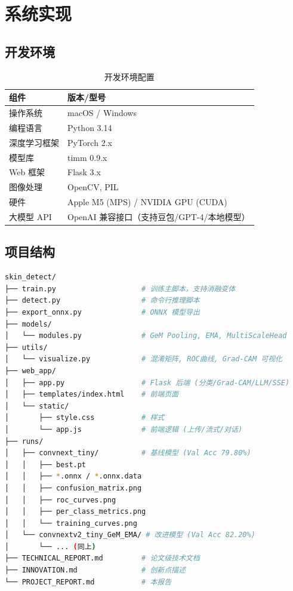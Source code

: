 \documentclass[12pt,a4paper]{report}
\begin{document}
\chapter{系统实现}

\section{开发环境}

\begin{table}[H]
    \centering
    \caption{开发环境配置}
    \label{tab:dev_env}
    \begin{tabular}{l l}
        \toprule
        \textbf{组件} & \textbf{版本/型号} \\
        \midrule
        操作系统 & macOS / Windows \\
        编程语言 & Python 3.14 \\
        深度学习框架 & PyTorch 2.x \\
        模型库 & timm 0.9.x \\
        Web 框架 & Flask 3.x \\
        图像处理 & OpenCV, PIL \\
        硬件 & Apple M5 (MPS) / NVIDIA GPU (CUDA) \\
        大模型 API & OpenAI 兼容接口（支持豆包/GPT-4/本地模型） \\
        \bottomrule
    \end{tabular}
\end{table}

\section{项目结构}

\begin{lstlisting}[language=bash, caption=项目目录结构]
skin_detect/
├── train.py                    # 训练主脚本，支持消融变体
├── detect.py                   # 命令行推理脚本
├── export_onnx.py              # ONNX 模型导出
├── models/
│   └── modules.py              # GeM Pooling, EMA, MultiScaleHead
├── utils/
│   └── visualize.py            # 混淆矩阵, ROC曲线, Grad-CAM 可视化
├── web_app/
│   ├── app.py                  # Flask 后端 (分类/Grad-CAM/LLM/SSE)
│   ├── templates/index.html    # 前端页面
│   └── static/
│       ├── style.css           # 样式
│       └── app.js              # 前端逻辑 (上传/流式/对话)
├── runs/
│   ├── convnext_tiny/          # 基线模型 (Val Acc 79.80%)
│   │   ├── best.pt
│   │   ├── *.onnx / *.onnx.data
│   │   ├── confusion_matrix.png
│   │   ├── roc_curves.png
│   │   ├── per_class_metrics.png
│   │   └── training_curves.png
│   └── convnextv2_tiny_GeM_EMA/ # 改进模型 (Val Acc 82.20%)
│       └── ... (同上)
├── TECHNICAL_REPORT.md         # 论文级技术文档
├── INNOVATION.md               # 创新点描述
└── PROJECT_REPORT.md           # 本报告
\end{lstlisting}
\end{document}
